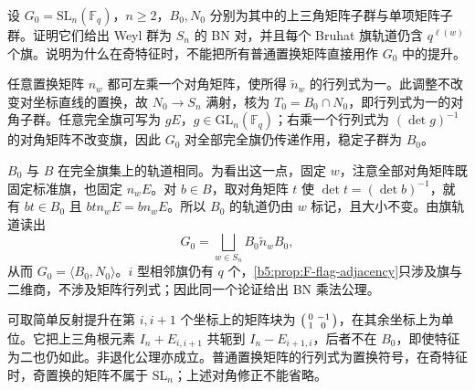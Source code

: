 \begin{exercise}\label{b5:ex:F-SL-BN}
	设 \(G_0=\mathrm{SL}_n(\mathbb F_q)\)，\(n\ge2\)，\(B_0,N_0\) 分别为其中的上三角矩阵子群与单项矩阵子群。证明它们给出 Weyl 群为 \(S_n\) 的 BN 对，并且每个 Bruhat 旗轨道仍含 \(q^{\ell(w)}\) 个旗。说明为什么在奇特征时，不能把所有普通置换矩阵直接用作 \(G_0\) 中的提升。
\end{exercise}
\begin{solution}
	任意置换矩阵 \(n_w\) 都可左乘一个对角矩阵，使所得 \(\widetilde n_w\) 的行列式为一。此调整不改变对坐标直线的置换，故 \(N_0\to S_n\) 满射，核为 \(T_0=B_0\cap N_0\)，即行列式为一的对角子群。任意完全旗可写为 \(gE\)，\(g\in\mathrm{GL}_n(\mathbb F_q)\)；右乘一个行列式为 \((\det g)^{-1}\) 的对角矩阵不改变旗，因此 \(G_0\) 对全部完全旗仍传递作用，稳定子群为 \(B_0\)。

	\(B_0\) 与 \(B\) 在完全旗集上的轨道相同。为看出这一点，固定 \(w\)，注意全部对角矩阵既固定标准旗，也固定 \(n_wE\)。对 \(b\in B\)，取对角矩阵 \(t\) 使 \(\det t=(\det b)^{-1}\)，就有 \(bt\in B_0\) 且 \(bt n_wE=bn_wE\)。所以 \(B_0\) 的轨道仍由 \(w\) 标记，且大小不变。由旗轨道读出
	\[
		G_0=\bigsqcup_{w\in S_n}B_0\widetilde n_wB_0,
	\]
	从而 \(G_0=\langle B_0,N_0\rangle\)。\(i\) 型相邻旗仍有 \(q\) 个，\cref{b5:prop:F-flag-adjacency}只涉及旗与二维商，不涉及矩阵行列式；因此同一个论证给出 BN 乘法公理。

	可取简单反射提升在第 \(i,i+1\) 个坐标上的矩阵块为 \(\begin{psmallmatrix}0&-1\\1&0\end{psmallmatrix}\)，在其余坐标上为单位。它把上三角根元素 \(I_n+E_{i,i+1}\) 共轭到 \(I_n-E_{i+1,i}\)，后者不在 \(B_0\)，即使特征为二也仍如此。非退化公理亦成立。普通置换矩阵的行列式为置换符号，在奇特征时，奇置换的矩阵不属于 \(\mathrm{SL}_n\)；上述对角修正不能省略。
\end{solution}


